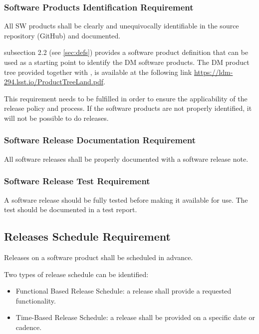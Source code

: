 \subsubsection{Software Products Identification Requirement} \label{sec:swid}

All \gls{SW} products shall be clearly and unequivocally identifiable in the source repository (GitHub) and documented.

 subsection 2.2 (see \ref{sec:defs}) provides a software product definition that can be used as a starting point to identify the DM software products.
The DM product tree provided together with , is available at the following link \url{https://ldm-294.lsst.io/ProductTreeLand.pdf}.

This requirement needs to be fulfilled in order to ensure the applicability of the release policy and process.
If the software products are not properly identified, it will not be possible to do releases.


\subsubsection{Software Release Documentation Requirement} \label{sec:reqdoc}

All software releases shall be properly documented with a software release note.


\subsubsection{Software Release Test Requirement} \label{sec:test}
 
A software release should be fully tested before making it available for use.
The test should be documented in a test report.


\subsection{Releases Schedule Requirement} \label{sec:milestone}

Releases on a software product shall be scheduled in advance.

Two types of release schedule can be identified:

\begin{itemize}
\item Functional Based Release Schedule: a release shall provide a requested functionality.
\item Time-Based Release Schedule: a release shall be provided on a specific date or cadence.
\end{itemize}

